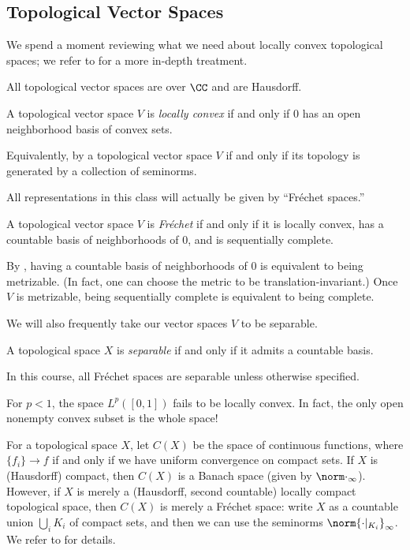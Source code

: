 \documentclass[../notes.tex]{subfiles}
\begin{document}
\subsection{Topological Vector Spaces}
We spend a moment reviewing what we need about locally convex topological spaces; we refer to  for a more in-depth treatment.
\begin{conv}
	All topological vector spaces are over $\CC$ and are Hausdorff.
\end{conv}
\begin{definition}
	A topological vector space $V$ is \textit{locally convex} if and only if $0$ has an open neighborhood basis of convex sets.
\end{definition}
\begin{remark}
	Equivalently, by  a topological vector space $V$ if and only if its topology is generated by a collection of seminorms.
\end{remark}
All representations in this class will actually be given by ``Fr\'echet spaces.''
\begin{definition}[Fr\'echet]
	A topological vector space $V$ is \textit{Fr\'echet} if and only if it is locally convex, has a countable basis of neighborhoods of $0$, and is sequentially complete.
\end{definition}
\begin{remark}
	By , having a countable basis of neighborhoods of $0$ is equivalent to being metrizable. (In fact, one can choose the metric to be translation-invariant.) Once $V$ is metrizable, being sequentially complete is equivalent to being complete.
\end{remark}
We will also frequently take our vector spaces $V$ to be separable.
\begin{definition}[separable]
	A topological space $X$ is \textit{separable} if and only if it admits a countable basis.
\end{definition}
\begin{conv}
	In this course, all Fr\'echet spaces are separable unless otherwise specified.
\end{conv}
\begin{nex}
	For $p<1$, the space $L^p([0,1])$ fails to be locally convex. In fact, the only open nonempty convex subset is the whole space!
\end{nex}
\begin{example}
	For a topological space $X$, let $C(X)$ be the space of continuous functions, where $\{f_i\}\to f$ if and only if we have uniform convergence on compact sets. If $X$ is (Hausdorff) compact, then $C(X)$ is a Banach space (given by $\norm\cdot_\infty$). However, if $X$ is merely a (Hausdorff, second countable) locally compact topological space, then $C(X)$ is merely a Fr\'echet space: write $X$ as a countable union $\bigcup_i K_i$ of compact sets, and then we can use the seminorms $\norm{\cdot|_{K_i}}_{\infty}$. We refer to  for details.
\end{example}
\end{document}
